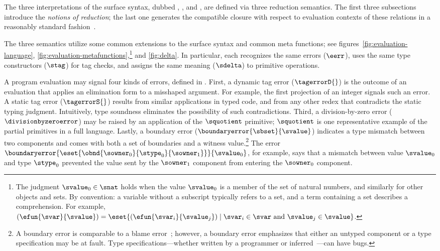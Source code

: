 
The three interpretations of the surface syntax, dubbed \Nname{}, \Tname{},
 and \Aname{}, are defined via three reduction semantics.
 The first three subsections introduce the {\em notions of reduction\/};
 the last one generates the compatible closure with respect to evaluation contexts of
 these relations in a reasonably standard fashion~\cite{barendregt-1981,fff:redex}. 

The three semantics utilize some common extensions to the surface syntax
and common meta functions; see figures~\ref{fig:evaluation-language},
\ref{fig:evaluation-metafunctions},\footnote{The judgment $\svalue_0 \in \snat$
   holds when the value $\svalue_0$ is a member of the set of natural numbers,
   and similarly for other objects and sets.
   By convention: a variable without a subscript typically refers to a set, and a
    term containing a set describes a comprehension.
   For example, $(\efun{\svar}{\svalue}) = \eset{(\efun{\svar_i}{\svalue_j}) \mid \svar_i \in \svar \mbox{ and } \svalue_j \in \svalue}$.}
and \ref{fig:delta}.
In particular, each
recognizes the same errors ($\eerr$), uses the same type
constructors ($\stag$) for tag checks,
and assigns the same meaning ($\sdelta$) to primitive
operations.

A program evaluation may signal four kinds of errors, defined in
.
First, a dynamic
tag error ($\tagerrorD{}$) is the outcome of an evaluation that applies an
 elimination form to a misshaped argument. For 
example, the first projection of an integer signals such an error.
A static tag error ($\tagerrorS{}$) results from similar applications in typed
 code, and from any other redex that contradicts the static typing judgment.
Intuitively, type soundness eliminates the possibility of such contradictions.
Third, 
a division-by-zero error ($\divisionbyzeroerror$) may be raised by an
 application of the $\squotient$ primitive; $\squotient$ is one representative
 example of the partial primitives in a full language.
Lastly, a boundary error ($\boundaryerror{\sbset}{\svalue}$)
 indicates a type mismatch between two components and comes with both a set of
 boundaries and a witness value.\footnote{A boundary error is comparable to a
   blame error~\cite{wf-esop-2009}; however, a boundary error emphasizes that
   either an untyped component or a type specification may be at fault.
   Type specifications---whether written by a programmer or inferred~\cite{cc-snapl-2019}---can have bugs.}
The error $\boundaryerror{\eset{\obnd{\sowner_0}{\stype_0}{\sowner_1}}}{\svalue_0}$,
 for example, says that a mismatch between value $\svalue_0$ and type $\stype_0$
 prevented the value sent by the $\sowner_1$ component from entering the $\sowner_0$ component.

